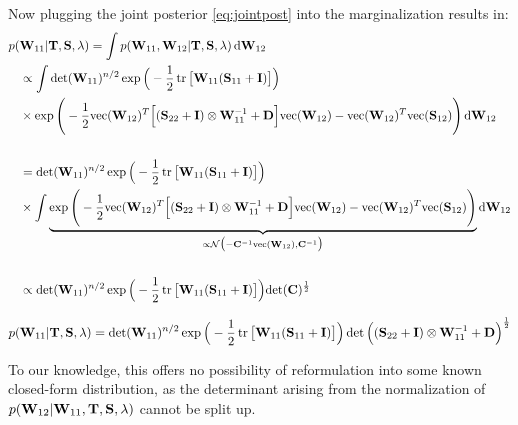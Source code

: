 Now plugging the joint posterior \autoref{eq:jointpost} into the marginalization results in:
\begin{align*}
	 p(&\mathbf{W}_{11} |  \mathbf{T}, \mathbf{S}, \lambda)=\int p(\mathbf{W}_{11}, \mathbf{W}_{12} |  \mathbf{T}, \mathbf{S}, \lambda)\mathop{}\!\mathrm{d}\mathbf{W}_{12}
	\\
	&\propto 
	\int
	\det(\mathbf{W}_{11})^{n/2} \exp \Big( - \frac{1}{2} \operatorname{tr}\big[ \mathbf{W}_{11} (\mathbf{S}_{11} + \mathbf{I}) \big]\Big)
	\\
	&\times \exp\Bigg(
	-\frac{1}{2}\text{vec}(\mathbf{W}_{12})^T \Big[
	(\mathbf{S}_{22} + \mathbf{I}) \otimes \mathbf{W}_{11}^{-1} +\mathbf{D}\Big]\text{vec}(\mathbf{W}_{12})
	- \text{vec}(\mathbf{W}_{12})^T \text{vec}(\mathbf{S}_{12})
	\Bigg)
	\mathop{}\!\mathrm{d}\mathbf{W}_{12}
	\\\\
	&= 
	\det(\mathbf{W}_{11})^{n/2} \exp \Big( - \frac{1}{2} \operatorname{tr}\big[ \mathbf{W}_{11} (\mathbf{S}_{11} + \mathbf{I}) \big]\Big)
	\\
	&\times 
	\int
	\underbrace{
		\exp\Bigg(
		-\frac{1}{2}\text{vec}(\mathbf{W}_{12})^T \Big[
		(\mathbf{S}_{22} + \mathbf{I}) \otimes \mathbf{W}_{11}^{-1} +\mathbf{D}\Big]\text{vec}(\mathbf{W}_{12})
		- \text{vec}(\mathbf{W}_{12})^T \text{vec}(\mathbf{S}_{12})
		\Bigg)
	}_{\propto\mathcal{N}\big(-\mathbf{C}^{-1}\text{vec}(\mathbf{W}_{12}), \mathbf{C}^{-1}\big)}
	\mathop{}\!\mathrm{d}\mathbf{W}_{12}		
	\\\\
	&\propto 
	\det(\mathbf{W}_{11})^{n/2} \exp \Big( - \frac{1}{2} \operatorname{tr}\big[ \mathbf{W}_{11} (\mathbf{S}_{11} + \mathbf{I}) \big]\Big)
	{\det(\mathbf{C})^{\frac{1}{2}}}
\end{align*}
\begin{tcolorbox}[colback=red!5!white,colframe=red!60!black, title=
	Posterior Marginal $\Wxx|\matr{T}\text{,}\matr{S}\text{,}\lambda$]
	\begin{equation*}
	p(\mathbf{W}_{11} |  \mathbf{T}, \mathbf{S}, \lambda)= 
	\det(\mathbf{W}_{11})^{n/2} \exp \Big( - \frac{1}{2} \operatorname{tr}\big[ \mathbf{W}_{11} (\mathbf{S}_{11} + \mathbf{I}) \big]\Big)
	\det
	\Big(
	(\mathbf{S}_{22} + \mathbf{I}) \otimes \mathbf{W}_{11}^{-1} +\mathbf{D}
	\Big)^{\frac{1}{2}}
	\end{equation*}
\end{tcolorbox}

To our knowledge, this offers no possibility of reformulation into some known closed-form distribution,
as the determinant arising from the normalization of $p(\mathbf{W}_{12} | \mathbf{W}_{11}, \mathbf{T}, \mathbf{S}, \lambda)$ cannot be split up.

